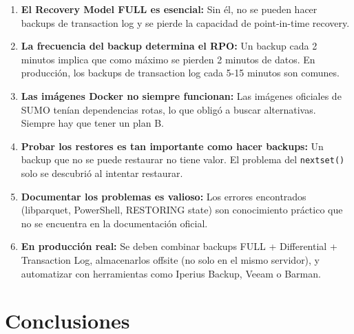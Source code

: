 \documentclass[12pt,a4paper]{article}
\begin{document}
\begin{enumerate}
  \item \textbf{El Recovery Model FULL es esencial:} Sin \'el, no se pueden hacer backups de transaction log y se pierde la capacidad de point-in-time recovery.

  \item \textbf{La frecuencia del backup determina el RPO:} Un backup cada 2 minutos implica que como m\'aximo se pierden 2 minutos de datos. En producci\'on, los backups de transaction log cada 5-15 minutos son comunes.

  \item \textbf{Las im\'agenes Docker no siempre funcionan:} Las im\'agenes oficiales de SUMO ten\'ian dependencias rotas, lo que oblig\'o a buscar alternativas. Siempre hay que tener un plan B.

  \item \textbf{Probar los restores es tan importante como hacer backups:} Un backup que no se puede restaurar no tiene valor. El problema del \texttt{nextset()} solo se descubri\'o al intentar restaurar.

  \item \textbf{Documentar los problemas es valioso:} Los errores encontrados (libparquet, PowerShell, RESTORING state) son conocimiento pr\'actico que no se encuentra en la documentaci\'on oficial.

  \item \textbf{En producci\'on real:} Se deben combinar backups FULL + Differential + Transaction Log, almacenarlos offsite (no solo en el mismo servidor), y automatizar con herramientas como Iperius Backup, Veeam o Barman.
\end{enumerate}

\section{Conclusiones}
\end{document}
